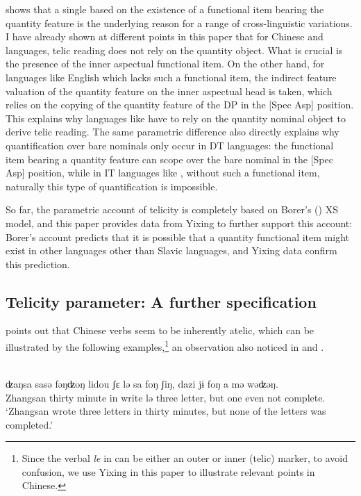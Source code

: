\documentclass[output=paper]{langsci/langscibook}
\begin{document}
 shows that a single  based on the
existence of a functional item bearing the quantity feature is the underlying
reason for a range of cross-linguistic variations. I have already shown at
different points in this paper that for Chinese and  languages, telic
reading does not rely on the quantity object. What is crucial is the presence
of the inner aspectual functional item. On the other hand, for languages like
English which lacks such a functional item, the indirect feature valuation of
the quantity feature on the inner aspectual head is taken, which relies on the
copying of the quantity feature of the DP in the [Spec Asp] position.
This explains why languages like  have to rely on the quantity nominal
object to derive telic reading. The same parametric difference also directly
explains why quantification over bare nominals only occur in DT languages: the
functional item bearing a quantity feature can scope over the bare nominal in
the [Spec Asp] position, while in IT languages like , without
such a functional item, naturally this type of quantification is impossible.

So far, the parametric account of telicity is completely based on Borer's
(\citeyear{Borer2005b}) XS model, and this paper provides data from Yixing to
further support this account: Borer's account predicts that it is possible that
a quantity functional item might exist in other languages other than
Slavic languages, and Yixing data confirm this
prediction.

\subsection{Telicity parameter: A further specification}\label{sub:17.5.2}

\textcite{huang2015syntactic} points out that Chinese verbs seem to be
inherently atelic, which can be illustrated by the following
examples,\footnote{Since the verbal \emph{le} in  can be either
    an outer or inner (telic) marker, to avoid confusion, we use Yixing in this
paper to illustrate relevant points in Chinese.} an observation also noticed in
\cite{tai1984} and \textcite{smith1997parameter}.

\begin{exe}
    \ex\label{inherently atelic} \\
\gll ʣaŋsa {sasə} {fəŋʣoŋ} lidou {ʃε} {lə} sa {foŋ} {ʃiŋ}, dazi {jɨ} {foŋ} a {mə} wəʣəŋ. \\
    Zhangsan thirty minute in write {lə} three \Clf{} letter, but one \Clf{} even not complete. \\
    \glt \enquote*{Zhangsan wrote three letters in thirty minutes, but none of the letters was completed.}
\end{exe}
\end{document}
